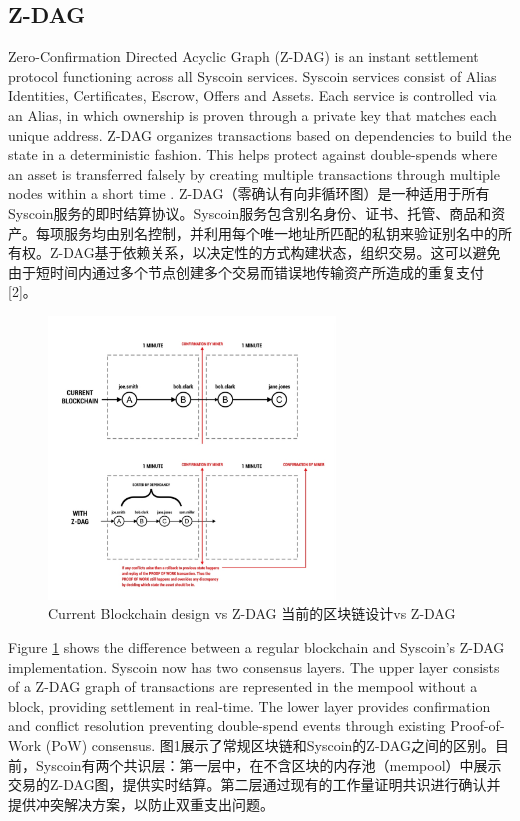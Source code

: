 \documentclass{ctexart}
\begin{document}
\subsection{Z-DAG}
Zero-Confirmation Directed Acyclic Graph (Z-DAG) is an instant settlement protocol functioning across all Syscoin services. Syscoin services consist of Alias Identities, Certificates, Escrow, Offers and Assets. Each service is controlled via an Alias, in which ownership is proven through a private key that matches each
unique address. Z-DAG organizes transactions based on dependencies to build the state in a deterministic fashion. This helps protect against double-spends where an asset is transferred falsely by creating multiple transactions through multiple nodes within a short time \cite{Sida18}. Z-DAG（零确认有向非循环图）是一种适用于所有Syscoin服务的即时结算协议。Syscoin服务包含别名身份、证书、托管、商品和资产。每项服务均由别名控制，并利用每个唯一地址所匹配的私钥来验证别名中的所有权。Z-DAG基于依赖关系，以决定性的方式构建状态，组织交易。这可以避免由于短时间内通过多个节点创建多个交易而错误地传输资产所造成的重复支付[2]。

\begin{figure}[h!]
\centering
\includegraphics[width=3in]{img/current_vs_zdag.png}
\caption{Current Blockchain design vs Z-DAG 当前的区块链设计vs Z-DAG} 
\label{fig:current_vs_zdag}
\end{figure} 

Figure \ref{fig:current_vs_zdag}  shows the difference between a regular blockchain and Syscoin’s Z-DAG implementation. Syscoin now has two consensus layers. The upper layer consists of a Z-DAG graph of transactions are represented in the mempool without a block, providing settlement in real-time. The lower layer provides confirmation and conflict resolution preventing double-spend events through existing Proof-of-Work (PoW) consensus. 图1展示了常规区块链和Syscoin的Z-DAG之间的区别。目前，Syscoin有两个共识层：第一层中，在不含区块的内存池（mempool）中展示交易的Z-DAG图，提供实时结算。第二层通过现有的工作量证明共识进行确认并提供冲突解决方案，以防止双重支出问题。
\end{document}
